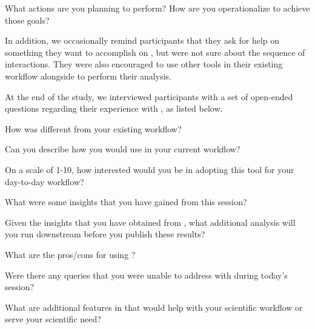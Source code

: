 {\begin{denselist}
    \item What actions are you planning to perform? How are you operationalize to achieve those goals?
   \end{denselist}
   In addition, we occasionally remind participants that they ask for help on something they want to accomplish on \zvpp, but were not sure about the sequence of interactions. They were also encouraged to use other tools in their existing workflow alongside \zvpp to perform their analysis. 
   \par At the end of the study, we interviewed participants with a set of open-ended questions regarding their experience with \zvpp, as listed below.
   \begin{denselist}
     \item How was \zvpp different from your existing workflow? 
     \item Can you describe how you would use \zvpp in your current workflow?
     \item On a scale of 1-10, how interested would you be in adopting this tool for your day-to-day workflow?
     \item What were some insights that you have gained from this session?
     \item Given the insights that you have obtained from \zvpp, what additional analysis will you run downstream before you publish these results? 
     \item What are the pros/cons for using \zvpp?
     \item Were there any queries that you were unable to address with \zvpp during today's session?
     \item What are additional features in \zvpp that would help with your scientific workflow or serve your scientific need?
   \end{denselist}
}

